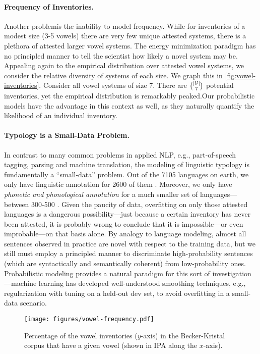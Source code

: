 \documentclass[11pt,a4paper]{article}
\renewcommand{\cite}[2][]{\citep[#1]{#2}}
\begin{document}
\paragraph{Frequency of Inventories.}
Another problemis the inability to model frequency. While for
inventories of a modest size (3-5 vowels) there are very few unique
attested systems, there is a plethora of attested larger vowel
systems.  The energy minimization paradigm has no principled manner to
tell the scientist how likely a novel system may be. Appealing
again to the empirical distribution over attested vowel systems, we
consider the relative diversity of systems of each size. We graph
this in \cref{fig:vowel-inventories}. Consider all vowel systems of
size 7. There are ${ |{\cal V}| \choose 7 }$ potential inventories,
yet the empirical distribution is remarkably peaked.Our probabilistic models have the advantage in this context as well, as they naturally
quantify the likelihood of an individual inventory.

\paragraph{Typology is a Small-Data Problem.}
In contrast to many common problems in applied NLP, e.g.,
part-of-speech tagging, parsing and machine translation, the modeling
of linguistic typology is fundamentally a ``small-data'' problem. Out of
the 7105 languages on earth, we only have linguistic annotation for
2600 of them \cite{wals-s1}.  Moreover, we only have
{\em phonetic and phonological annotation} for a much smaller set of
languages---between 300-500 \cite{wals-2}. Given the paucity of data,
overfitting on only those attested languages is a dangerous
possibility---just because a certain inventory has never been
attested, it is probably wrong to conclude that it is impossible---or
even improbable---on that basis alone.  By analogy to language
modeling, almost all sentences observed in practice are novel
with respect to the training data, but we still must employ a
principled manner to discriminate high-probability sentences (which
are syntactically and semantically coherent) from low-probability
ones.  Probabilistic modeling provides a natural paradigm for
this sort of investigation---machine learning has developed
well-understood smoothing techniques, e.g., regularization with tuning
on a held-out dev set, to avoid overfitting in a small-data scenario.

\begin{figure}
  \texttt{[image: figures/vowel-frequency.pdf]}
  \caption{Percentage of the vowel inventories ($y$-axis) in the Becker-Kristal corpus \cite{becker2010acoustic} that have a given vowel (shown
    in IPA along the $x$-axis).}
  \label{fig:vowel-frequency}
\end{figure}
\end{document}
